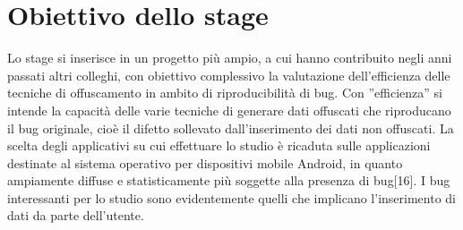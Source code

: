 \clearpage
\section*{Obiettivo dello stage}
Lo stage si inserisce in un progetto più ampio, a cui hanno contribuito negli anni passati altri colleghi, con obiettivo complessivo la valutazione dell'efficienza delle tecniche di offuscamento in ambito di riproducibilità di bug. Con ''efficienza'' si intende la capacità delle varie tecniche di generare dati offuscati che riproducano il bug originale, cioè il difetto sollevato dall'inserimento dei dati non offuscati.  La scelta degli applicativi su cui effettuare lo studio è ricaduta sulle applicazioni destinate al sistema operativo per dispositivi mobile Android, in quanto ampiamente diffuse e statisticamente più soggette alla presenza di bug[16]. I bug interessanti per lo studio sono evidentemente quelli che implicano l'inserimento di dati da parte dell'utente.

